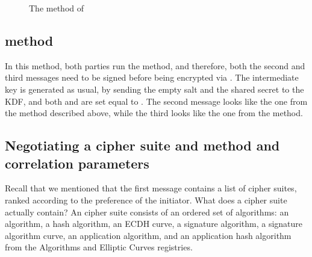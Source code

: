 {\begin{figure}[!h]
{}
\caption{The \mStatSig{} method of \mEdhoc}
\label{fig:edhocstatsig}
\end{figure}

\subsection{\mSigSig{} method}
In this method, both parties run the \mSig{} method, and therefore, both the
second and third messages need to be signed before being encrypted via \mAead.
The intermediate key \mPRKtwo{} is generated as usual, by sending the empty salt
and the shared secret to the KDF, and both \mPRKthree{} and \mPRKfour{} are set equal to \mPRKtwo. The second message looks like the one from the \mSigStat{} method described above, while the third looks like the one from the \mStatSig{} method.

\subsection{Negotiating a cipher suite and method and correlation parameters}
\label{sec:ciphersuite}
Recall that we mentioned that the first message contains a list of cipher suites, ranked according to the preference of the initiator. What does a cipher suite actually contain? An \mEdhoc{} cipher suite consists of an ordered set of \mCose{} algorithms: an \mAead{} algorithm, a hash algorithm, an ECDH curve, a signature algorithm, a signature algorithm curve, an application \mAead{} algorithm, and an application hash algorithm from the \mCose{} Algorithms and Elliptic Curves registries.  

}
